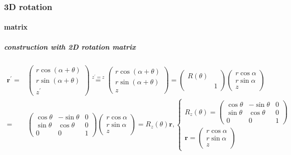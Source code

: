 \documentclass[
]{book}
\theoremstyle{definition}
\theoremstyle{definition}
\theoremstyle{definition}
\theoremstyle{definition}
\theoremstyle{remark}
\begin{document}
\hypertarget{d-rotation-1}{%
\subsubsection{3D rotation}\label{d-rotation-1}}

\hypertarget{matrix-2}{%
\paragraph{matrix}\label{matrix-2}}

\hypertarget{construction-with-2d-rotation-matrix}{%
\subparagraph{construction with 2D rotation matrix}\label{construction-with-2d-rotation-matrix}}

\[
\begin{aligned}
\boldsymbol{r}^{\prime}= & \begin{pmatrix}r\cos\left(\alpha+\theta\right)\\
r\sin\left(\alpha+\theta\right)\\
z^{\prime}
\end{pmatrix}\overset{z^{\prime}=z}{=}\begin{pmatrix}r\cos\left(\alpha+\theta\right)\\
r\sin\left(\alpha+\theta\right)\\
z
\end{pmatrix}=\begin{pmatrix}R\left(\theta\right)\\
 & 1
\end{pmatrix}\begin{pmatrix}r\cos\alpha\\
r\sin\alpha\\
z
\end{pmatrix}\\
= & \begin{pmatrix}\cos\theta & -\sin\theta & 0\\
\sin\theta & \cos\theta & 0\\
0 & 0 & 1
\end{pmatrix}\begin{pmatrix}r\cos\alpha\\
r\sin\alpha\\
z
\end{pmatrix}=R_{{\scriptscriptstyle z}}\left(\theta\right)\boldsymbol{r},\begin{cases}
R_{{\scriptscriptstyle z}}\left(\theta\right)=\begin{pmatrix}\cos\theta & -\sin\theta & 0\\
\sin\theta & \cos\theta & 0\\
0 & 0 & 1
\end{pmatrix}\\
\boldsymbol{r}=\begin{pmatrix}r\cos\alpha\\
r\sin\alpha\\
z
\end{pmatrix}
\end{cases}
\end{aligned}
\]
\end{document}
